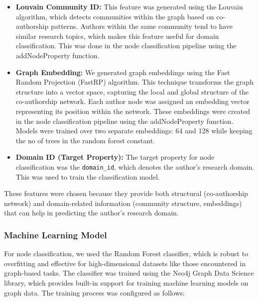 \documentclass[conference, 12pt]{IEEEtran}
\begin{document}
\begin{itemize}
  \item \textbf{Louvain Community ID:} This feature was generated using the Louvain algorithm, which detects communities 
  within the graph based on co-authorship patterns. Authors within the same community tend to have similar research topics, 
  which makes this feature useful for domain classification. This was done in the node classification pipeline using the 
  addNodeProperty function.
  \item \textbf{Graph Embedding:} We generated graph embeddings using the Fast Random Projection (FastRP) algorithm. 
  This technique transforms the graph structure into a vector space, capturing the local and global structure of the 
  co-authorship network. Each author node was assigned an embedding vector representing its position within the network.
  These embeddings were created in the node classification pipeline using the addNodeProperty function. Models were trained
  over two separate embeddings: 64 and 128 while keeping the no of trees in the random forest constant.
  \item \textbf{Domain ID (Target Property):} The target property for node classification was the \texttt{domain\_id}, which denotes the author's research domain. This was used to train the classification model.
\end{itemize}

These features were chosen because they provide both structural (co-authorship network) and domain-related information (community structure, embeddings) that can help in predicting the author's research domain.

\subsubsection{Machine Learning Model}
For node classification, we used the Random Forest classifier, which is robust to overfitting and effective for 
high-dimensional datasets like those encountered in graph-based tasks. The classifier was trained using the Neo4j 
Graph Data Science library, which provides built-in support for training machine learning models on graph data. The 
training process was configured as follows:
\end{document}
